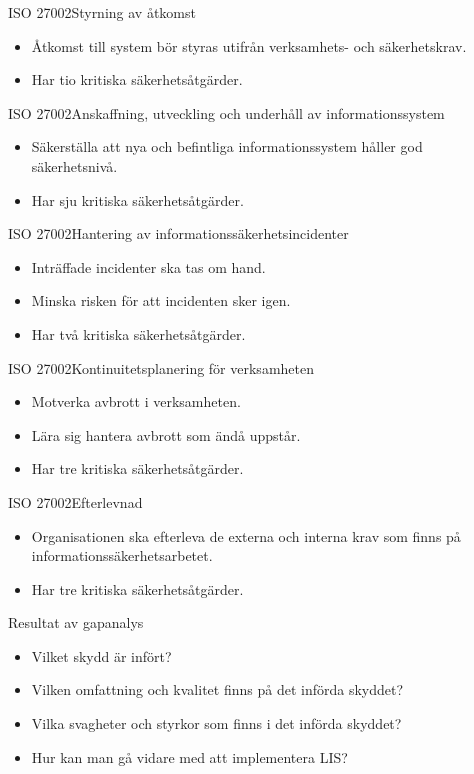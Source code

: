 \documentclass{beamer}
\begin{document}
\begin{frame}{ISO 27002}{Styrning av åtkomst}
  \begin{itemize}
    \item Åtkomst till system bör styras utifrån verksamhets- och 
      säkerhetskrav.
    \item Har tio kritiska säkerhetsåtgärder.
  \end{itemize}
\end{frame}
\begin{frame}{ISO 27002}{Anskaffning, utveckling och underhåll av 
  informationssystem}
  \begin{itemize}
    \item Säkerställa att nya och befintliga informationssystem håller god 
      säkerhetsnivå.
    \item Har sju kritiska säkerhetsåtgärder.
  \end{itemize}
\end{frame}
\begin{frame}{ISO 27002}{Hantering av informationssäkerhetsincidenter}
  \begin{itemize}
    \item Inträffade incidenter ska tas om hand.
    \item Minska risken för att incidenten sker igen.
    \item Har två kritiska säkerhetsåtgärder.
  \end{itemize}
\end{frame}
\begin{frame}{ISO 27002}{Kontinuitetsplanering för verksamheten}
  \begin{itemize}
    \item Motverka avbrott i verksamheten.
    \item Lära sig hantera avbrott som ändå uppstår.
    \item Har tre kritiska säkerhetsåtgärder.
  \end{itemize}
\end{frame}
\begin{frame}{ISO 27002}{Efterlevnad}
  \begin{itemize}
    \item Organisationen ska efterleva de externa och interna krav som finns på 
      informationssäkerhetsarbetet.
    \item Har tre kritiska säkerhetsåtgärder.
  \end{itemize}
\end{frame}
\begin{frame}{Resultat av gapanalys}
  \begin{itemize}
    \item Vilket skydd är infört?
    \item Vilken omfattning och kvalitet finns på det införda skyddet?
    \item Vilka svagheter och styrkor som finns i det införda skyddet?
    \item Hur kan man gå vidare med att implementera LIS\@?
  \end{itemize}
\end{frame}
\end{document}
